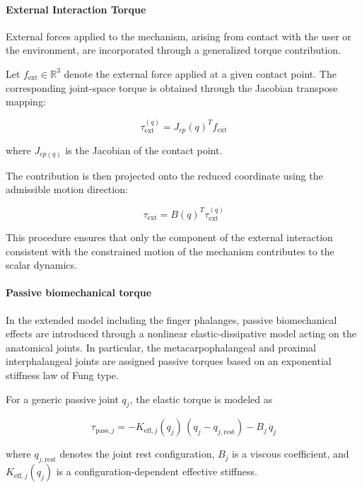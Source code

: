 \paragraph{External Interaction Torque}

External forces applied to the mechanism, arising from contact with the user or the environment, are incorporated through a generalized torque contribution.

Let $f_{\text{ext}} \in \mathbb{R}^3$ denote the external force applied at a given contact point. The corresponding joint-space torque is obtained through the Jacobian transpose mapping:

\begin{equation}
    \tau_{\text{ext}}^{(q)} = J_{cp}(q)^T f_{\text{ext}}
\end{equation}

where $J_{cp(q)}$ is the Jacobian of the contact point.

The contribution is then projected onto the reduced coordinate using the admissible motion direction:

\begin{equation}
    \tau_{\text{ext}} = B(q)^T \tau_{\text{ext}}^{(q)}
\end{equation}

This procedure ensures that only the component of the external interaction consistent with the constrained motion of the mechanism contributes to the scalar dynamics.

\paragraph{Passive biomechanical torque}
In the extended model including the finger phalanges, passive biomechanical effects are introduced through a nonlinear elastic-dissipative model acting on the anatomical joints. In particular, the metacarpophalangeal and proximal interphalangeal joints are assigned passive torques based on an exponential stiffness law of Fung type.

For a generic passive joint $q_j$, the elastic torque is modeled as

\begin{equation}
   \tau_{\mathrm{pass},j}
=
-
K_{\mathrm{eff},j}(q_j)\,(q_j-q_{j,\mathrm{rest}})
-
B_j\,\dot q_j 
\end{equation}

where $ q_{j,\mathrm{rest}} $ denotes the joint rest configuration, $ B_j $ is a viscous coefficient, and $ K_{\mathrm{eff},j}(q_j) $ is a configuration-dependent effective stiffness.

